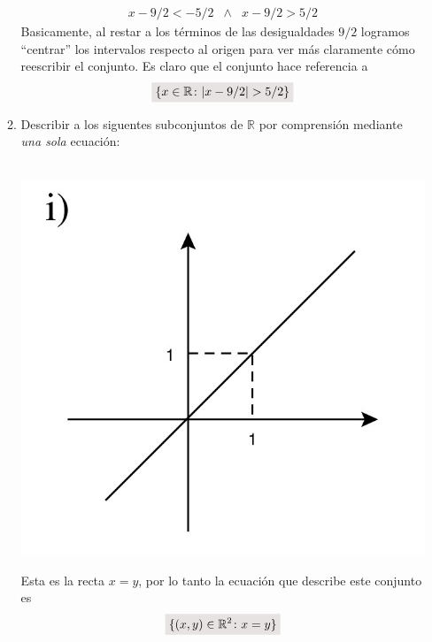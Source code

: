 \documentclass[a4paper,11pt]{article}
\newcommand{\real}{\mathbb{R}}
\newcommand{\resalta}[1]{\colorbox{g}{$\displaystyle #1$}}
\begin{document}
\begin{enumerate}
\begin{enumerate}[label = \roman*)]
\begin{eqnarray*}
                x -9/2<-5/2&\wedge& x-9/2>5/2
            \end{eqnarray*}
            Basicamente, al restar a los t\'erminos de las desigualdades $9/2$ logramos ``centrar'' los intervalos respecto al origen para ver m\'as claramente c\'omo reescribir el conjunto. Es claro que el conjunto hace referencia a
            \begin{equation}
                \notag\resalta{\{x \in \real \colon |x-9/2|>5/2\}}
            \end{equation}
            \item Describir a los siguentes subconjuntos de $\real$ por comprensi\'on mediante \textit{una sola} ecuaci\'on:\\
            \\
            \begin{minipage}[c]{0.3\linewidth}
                \centering
                    \includegraphics[scale=0.15]{4ii-1}
            \end{minipage}
            \begin{minipage}[c]{0.7\linewidth}
                Esta es la recta $x=y$, por lo tanto la ecuaci\'on que describe este conjunto es
                \begin{equation}
                    \notag \resalta{\{(x,y)\in \real^{2} \colon x=y\}}
                \end{equation}
            \end{minipage}

\end{enumerate}
\end{enumerate}
\end{document}
